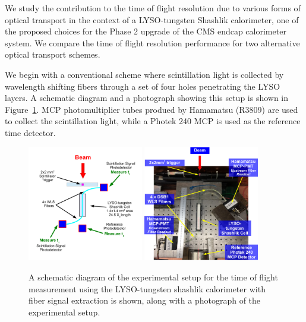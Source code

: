 \documentclass[11pt]{article}
\begin{document}
We study the contribution to the time of flight resolution due to
various forms of optical transport in the context of a LYSO-tungsten Shashlik
calorimeter, one of the proposed choices for the Phase 2 upgrade of the
CMS endcap calorimeter system. We compare the time of flight resolution
performance for two alternative optical transport schemes. 

We begin with a conventional scheme where scintillation light is collected
by wavelength shifting fibers through a set of four holes penetrating 
the LYSO layers. A schematic diagram and a photograph showing this setup 
is shown in Figure~\ref{fig:ShashlikFiberSetup}. 
MCP photomultiplier tubes produed by Hamamatsu (R3809) are used to collect 
the scintillation light, while a Photek 240 MCP is used as the reference 
time detector. 


\begin{figure}[h] \centering
\includegraphics[width=0.45\textwidth]{figs/ShashlikFiberSetupSchematic} 
\includegraphics[width=0.45\textwidth]{figs/ShashlikFiberSetupPhoto} 
\caption{ A schematic diagram of the experimental setup for the
time of flight measurement using the LYSO-tungsten shashlik calorimeter
with fiber signal extraction is shown, along with a photograph of the
experimental setup. } 
\label{fig:ShashlikFiberSetup}
\end{figure}
\end{document}
